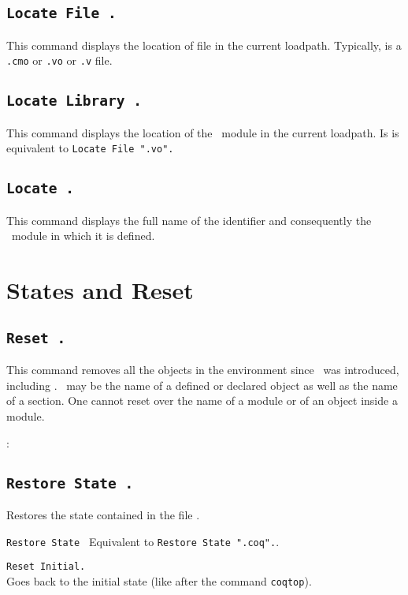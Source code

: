 \subsection{\tt Locate File {\str}.}\label{Locate File}
This command displays the location of file {\str} in the current loadpath.
Typically, {\str} is a \texttt{.cmo} or \texttt{.vo} or \texttt{.v} file.

\subsection{\tt Locate Library {\ident}.}
This command displays the location of the \Coq\ module {\ident} in the current
loadpath. Is is equivalent to {\tt Locate File "}{\ident}{\tt .vo".}

\subsection{\tt Locate {\ident}.}
This command displays the full name of the identifier {\ident}
and consequently the \Coq\ module in which it is defined.

\section{States and Reset}

\subsection{\tt Reset \ident.}
This command removes all the objects in the environment since \ident\ 
was introduced, including \ident. \ident\ may be the name of a defined
or declared object as well as the name of a section.  One cannot reset
over the name of a module or of an object inside a module.

\begin{ErrMsgs}
\item \ident: 
\end{ErrMsgs}

\subsection{\tt Restore State \ident.}
  Restores the state contained in the file \str.

\begin{Variants}
\item {\tt Restore State \ident}
 Equivalent to {\tt Restore State "}{\ident}{\tt .coq".}.
\item {\tt Reset Initial.}\\ 
  Goes back to the
  initial state (like after the command {\tt coqtop}).
\end{Variants}

